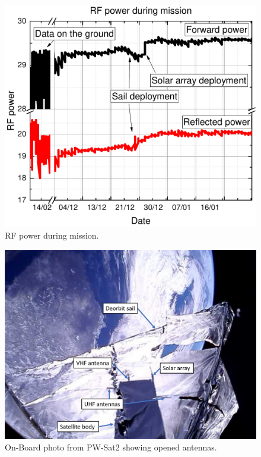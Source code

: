 \begin{figure}[H]
    \centering
    \includegraphics[width=0.6\paperwidth]{img/6/rf_power_comm.pdf}
    \caption{RF power during mission.}
    \label{4_rf_power_comm}
\end{figure}

\begin{figure}
    \centering
    \includegraphics[width=0.7\paperwidth]{img/6/antennas_deployed_orbit.jpg}
    \caption{On-Board photo from PW-Sat2 showing opened antennas.}
    \label{antennas_deployed_orbit}
\end{figure}


